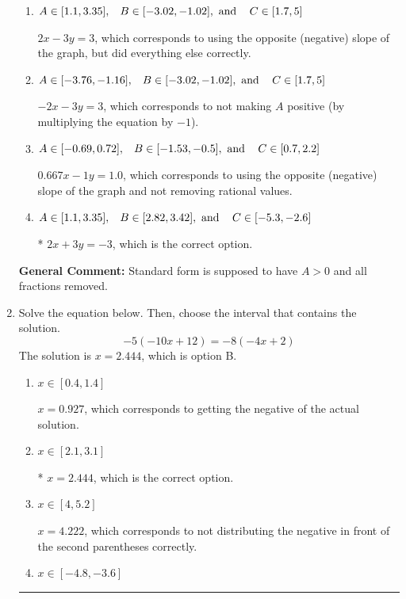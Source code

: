 \documentclass{extbook}[14pt]
\newcommand{\litem}[1]{\item #1

\rule{\textwidth}{0.4pt}}
\begin{document}
\begin{enumerate}
{\begin{enumerate}[label=\Alph*.]
 $0.667x + 1y = -1.0$, which corresponds to not removing rational values for Standard Form.
\item \( A \in [1.1, 3.35], \hspace{3mm} B \in [-3.02, -1.02], \text{ and } \hspace{3mm} C \in [1.7, 5] \)

 $2x - 3y = 3$, which corresponds to using the opposite (negative) slope of the graph, but did everything else correctly.
\item \( A \in [-3.76, -1.16], \hspace{3mm} B \in [-3.02, -1.02], \text{ and } \hspace{3mm} C \in [1.7, 5] \)

 $-2x - 3y = 3$, which corresponds to not making $A$ positive (by multiplying the equation by $-1$).
\item \( A \in [-0.69, 0.72], \hspace{3mm} B \in [-1.53, -0.5], \text{ and } \hspace{3mm} C \in [0.7, 2.2] \)

 $0.667x - 1y = 1.0$, which corresponds to using the opposite (negative) slope of the graph and not removing rational values.
\item \( A \in [1.1, 3.35], \hspace{3mm} B \in [2.82, 3.42], \text{ and } \hspace{3mm} C \in [-5.3, -2.6] \)

* $2x + 3y = -3$, which is the correct option.
\end{enumerate}

\textbf{General Comment:} Standard form is supposed to have $A > 0$ and all fractions removed.
}
\litem{
Solve the equation below. Then, choose the interval that contains the solution.
\[ -5(-10x + 12) = -8(-4x + 2) \]The solution is \( x = 2.444 \), which is option B.\begin{enumerate}[label=\Alph*.]
\item \( x \in [0.4, 1.4] \)

$x = 0.927$, which corresponds to getting the negative of the actual solution.
\item \( x \in [2.1, 3.1] \)

* $x = 2.444$, which is the correct option.
\item \( x \in [4, 5.2] \)

$x = 4.222$, which corresponds to not distributing the negative in front of the second parentheses correctly.
\item \( x \in [-4.8, -3.6] \)


\end{enumerate}}
\end{enumerate}
\end{document}
